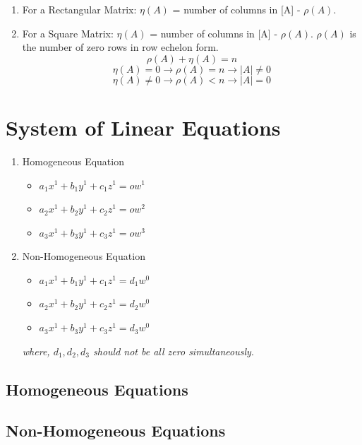 \begin{enumerate}
    \item For a Rectangular Matrix: $\eta (A)$ = number of columns in [A] - $\rho (A)$.

    \item For a Square Matrix: $\eta (A)$ = number of columns in [A] - $\rho (A)$. $\rho (A)$ is the number of zero rows in row echelon form.
    $$ \rho (A) + \eta (A) = n $$
    $$ \eta (A) = 0 \longrightarrow \rho (A) = n \longrightarrow |A| \neq 0 $$
    $$ \eta (A) \neq 0 \longrightarrow \rho (A) < n \longrightarrow |A| = 0 $$
\end{enumerate}

\section{System of Linear Equations}

\begin{enumerate}
    \item Homogeneous Equation
    \begin{itemize}
        \item $a_1 x^1 + b_1 y^1 + c_1 z^1 = ow^1$
        \item $a_2 x^1 + b_2 y^1 + c_2 z^1 = ow^2$
        \item $a_3 x^1 + b_3 y^1 + c_3 z^1 = ow^3$
    \end{itemize}

    \item Non-Homogeneous Equation
    \begin{itemize}
        \item $a_1 x^1 + b_1 y^1 + c_1 z^1 = d_1 w^0$
        \item $a_2 x^1 + b_2 y^1 + c_2 z^1 = d_2 w^0$
        \item $a_3 x^1 + b_3 y^1 + c_3 z^1 = d_3 w^0$
    \end{itemize}
    \textit{where, $d_1, d_2, d_3$ should not be all zero simultaneously}.
\end{enumerate}

\subsection{Homogeneous Equations}
\subsection{Non-Homogeneous Equations}

